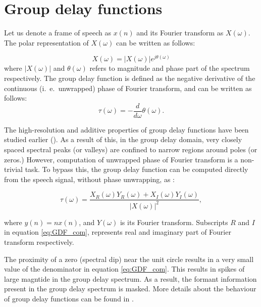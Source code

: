 \documentclass[conference]{IEEEtran}
\begin{document}
\section{Group delay functions}
\label{fe}
Let us denote a frame of speech as $x(n)$ and its Fourier transform as
$X(\omega)$. The polar representation of $X(\omega)$ can be written as follows:

\begin{equation}
X(\omega) = |X(\omega)| e^{j\theta(\omega)} 
\label{equ:FT}
\end{equation}     
where $|X(\omega)|$ and $\theta(\omega)$ refers to magnitude and phase part of
the spectrum respectively. The group delay function is defined as the
negative derivative of the continuous (i.~e.~unwrapped) phase of Fourier transform, and can be written
as follows: 
\begin{equation}
\tau(\omega) =  - \frac{d}{d\omega} \theta(\omega).
\label{equ:GDF_def}
\end{equation}

The high-resolution and additive properties of group delay functions have been
studied earlier (\cite{yegnaJASA, gdSurvey}). As a result of this, in the
group delay domain, very closely
spaced spectral peaks (or valleys) are confined to narrow regions around poles
(or zeros.) However, computation of unwrapped phase of Fourier transform is a
non-trivial task. To bypass this, the group delay function can be computed
directly from the speech signal, without phase unwrapping, as
\cite{gdDerivationIcassp}:

\begin{equation}
\tau(\omega) = \frac{X_R(\omega)Y_R(\omega) +
X_I(\omega)Y_I(\omega)}{|X(\omega)|^{2}},
\label{eq:GDF_com}
\end{equation}

where $y(n) = n x(n)$, and $Y(\omega)$ is its Fourier transform. 
Subscripts $R$ and $I$ in equation \ref{eq:GDF_com}, represents real and
imaginary part of Fourier transform respectively. 

The proximity of a zero (spectral dip) near the
unit circle results in a very small value of the denominator in
equation \ref{eq:GDF_com}. This results in spikes of large magntide in the group
delay spectrum. As a result, the formant information present in the group delay
spectrum is masked. More details about the behaviour of group delay functions
can be found in \cite{gdSurvey}.
\end{document}
